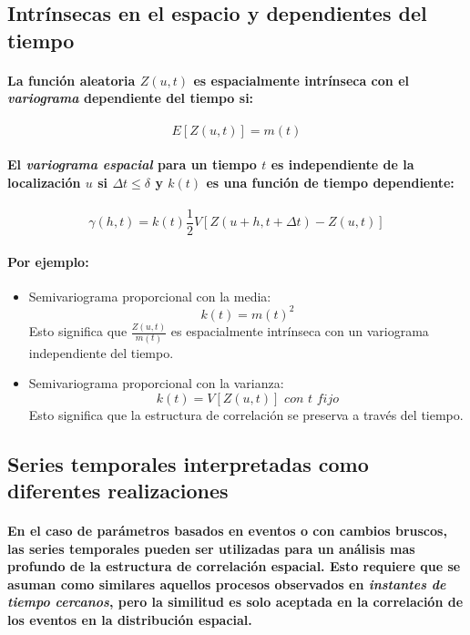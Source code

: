 \subsection{Intrínsecas en el espacio y dependientes del tiempo}
\paragraph{
La función aleatoria $Z(u,t)$ es espacialmente intrínseca con el \emph{variograma} dependiente del tiempo si:
}
\begin{equation}
E[Z(u,t)] = m(t)
\end{equation}
\paragraph{
El \emph{variograma espacial} para un tiempo $t$ es independiente de la localización $u$ si $\Delta t \leq \delta$ y $k(t)$ es una función de tiempo dependiente:
}
\begin{equation}
\gamma(h,t) = k(t) \frac{1}{2} V[Z(u+h,t+\Delta t) - Z(u,t)]
\end{equation}
\paragraph{
Por ejemplo:
}
\begin{itemize}
\item Semivariograma proporcional con la media:
\begin{equation}
k(t) = m(t)^2
\end{equation}
Esto significa que $\frac{Z(u,t)}{m(t)}$ es espacialmente intrínseca con un variograma independiente del tiempo.
\item Semivariograma proporcional con la varianza:
\begin{equation}
k(t) = V[Z(u,t)] \textit{ con $t$ fijo}
\end{equation}
Esto significa que la estructura de correlación se preserva a través del tiempo.
\end{itemize}


\subsection{Series temporales interpretadas como diferentes realizaciones}
\paragraph{
En el caso de parámetros basados en eventos o con cambios bruscos, las series temporales pueden ser utilizadas para un análisis mas profundo de la estructura de correlación espacial. Esto requiere que se asuman como similares aquellos procesos observados en \emph{instantes de tiempo cercanos}, pero la similitud es solo aceptada en la correlación de los eventos en la distribución espacial.
}
